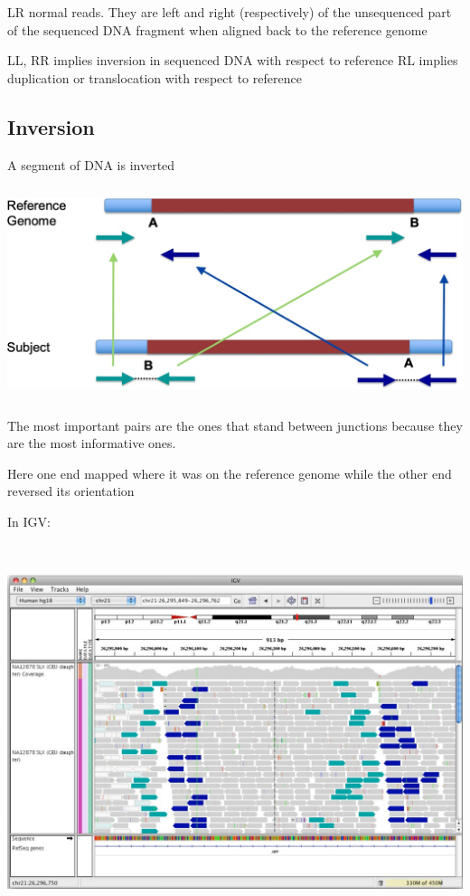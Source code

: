 LR normal reads. They are left and right (respectively) of the unsequenced part
of the sequenced DNA fragment when aligned back to the reference genome

LL, RR implies inversion in sequenced DNA with respect to reference RL implies
duplication or translocation with respect to reference


\hypertarget{inversion}{%
\subsection{Inversion}\label{inversion}}


A segment of DNA is inverted


\includegraphics[width=5.85745in,height=2.45625in]{image21.jpeg}


The most important pairs are the ones that stand between junctions because they
are the most informative ones.

Here one end mapped where it was on the reference genome while the other end
reversed its orientation

In IGV:


\includegraphics[width=6.29861in,height=4.32833in]{image22.jpeg}


